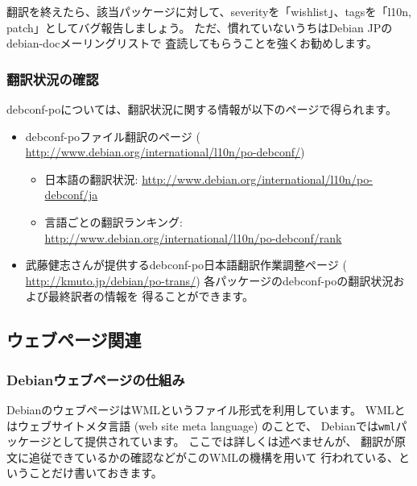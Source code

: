 \documentclass[mingoth,a4paper]{jsarticle}
\begin{document}
翻訳を終えたら、該当パッケージに対して、severityを「wishlist」、tagsを「l10n,
patch」としてバグ報告しましょう。
ただ、慣れていないうちはDebian JPのdebian-docメーリングリストで
査読してもらうことを強くお勧めします。


\subsubsection{翻訳状況の確認}
\label{subsubsec:debconf-po-check}

debconf-poについては、翻訳状況に関する情報が以下のページで得られます。
\begin{itemize}
 \item debconf-poファイル翻訳のページ (%
       \url{http://www.debian.org/international/l10n/po-debconf/})
       \begin{itemize}
	\item 日本語の翻訳状況:
	      \url{http://www.debian.org/international/l10n/po-debconf/ja}
	\item 言語ごとの翻訳ランキング:
	      \url{http://www.debian.org/international/l10n/po-debconf/rank}
       \end{itemize}
 \item 武藤健志さんが提供するdebconf-po日本語翻訳作業調整ページ (%
	    \url{http://kmuto.jp/debian/po-trans/})
       各パッケージのdebconf-poの翻訳状況および最終訳者の情報を
       得ることができます。
\end{itemize}

\subsection{ウェブページ関連}

\subsubsection{Debianウェブページの仕組み}

DebianのウェブページはWMLというファイル形式を利用しています。
WMLとはウェブサイトメタ言語 (web site meta language) のことで、
Debianでは\texttt{wml}パッケージとして提供されています。
ここでは詳しくは述べませんが、
翻訳が原文に追従できているかの確認などがこのWMLの機構を用いて
行われている、ということだけ書いておきます。
\end{document}
